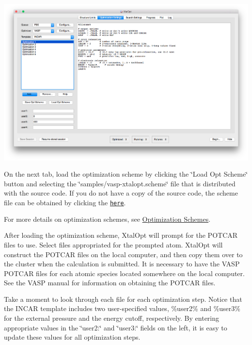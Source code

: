 \begin{DoxyImageNoCaption}
  \mbox{\includegraphics[width=\textwidth]{opt-set-vasp.png}}
\end{DoxyImageNoCaption}


On the next tab, load the optimization scheme by clicking the \char`\"{}\+Load
\+Opt Scheme\char`\"{} button and selecting the \char`\"{}samples/vasp-\/xtalopt.\+scheme\char`\"{} file that is distributed with the source code. If you do not have a copy of the source code, the scheme file can be obtained by clicking the \href{http://xtalopt.github.io/samples/vasp-xtalopt.scheme}{\tt here}.

For more details on optimization schemes, see \hyperlink{optschemes}{Optimization Schemes}.

After loading the optimization scheme, Xtal\+Opt will prompt for the P\+O\+T\+C\+A\+R files to use. Select files appropriated for the prompted atom. Xtal\+Opt will construct the P\+O\+T\+C\+A\+R files on the local computer, and then copy them over to the cluster when the calculation is submitted. It is necessary to have the V\+A\+S\+P P\+O\+T\+C\+A\+R files for each atomic species located somewhere on the local computer. See the V\+A\+S\+P manual for information on obtaining the P\+O\+T\+C\+A\+R files.

Take a moment to look through each file for each optimization step. Notice that the I\+N\+C\+A\+R template includes two user-\/specified values, \%user2\% and \%user3\% for the external pressure and the energy cutoff, respectively. By entering appropriate values in the \char`\"{}user2\+:\char`\"{} and \char`\"{}user3\+:\char`\"{} fields on the left, it is easy to update these values for all optimization steps.


